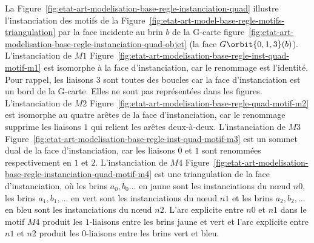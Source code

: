 La Figure~\ref{fig:etat-art-modelisation-base-regle-instanciation-quad} illustre l'instanciation des
motifs de la
Figure~\ref{fig:etat-art-model-base-regle-motifs-triangulation} par la
face incidente au brin $b$ de la G-carte
figure~\ref{fig:etat-art-modelisation-base-regle-instanciation-quad-objet} (la face
$G\orbit{0,1,3}(b)$). %
L'instanciation de $M1$ Figure~\ref{fig:etat-art-modelisation-base-regle-inst-quad-motif-m1} est
isomorphe à la face d'instanciation, car le renommage est l'identité. %
Pour rappel, les liaisons $3$ sont toutes des boucles car la face d'instanciation est un bord de la G-carte. %
Elles ne sont pas représentées dans les figures. %
L'instanciation de $M2$ Figure~\ref{fig:etat-art-modelisation-base-regle-quad-motif-m2} est isomorphe
au quatre arêtes de la face d'instanciation, car le renommage supprime les
liaisons $1$ qui relient les arêtes deux-à-deux. %
L'instanciation de $M3$ Figure~\ref{fig:etat-art-modelisation-base-regle-inst-quad-motif-m3} est un sommet
dual de la face d'instanciation, car les liaisons $0$ et $1$ sont renommées
respectivement en $1$ et $2$. %
L'instanciation de $M4$ Figure~\ref{fig:etat-art-modelisation-base-regle-instanciation-quad-motif-m4} est une
triangulation de la face d'instanciation, où les brins $a_0, b_0\dots$ en jaune
sont les instanciations du n\oe ud $n0$, les brins $a_1,b_1,\dots$ en vert sont les instanciations du n\oe ud $n1$ et les brins $a_2,b_2,\dots$ en bleu sont les
instanciations du n\oe ud $n2$. L'arc explicite entre $n0$ et $n1$ dans le motif
$M4$ produit les $1$-liaisons entre les brins jaune et vert et l'arc explicite
entre $n1$ et $n2$ produit les $0$-liaisons entre les brins vert et bleu. %


